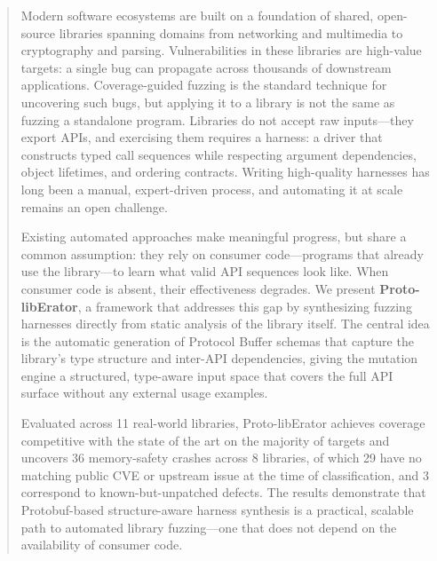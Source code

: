 \documentclass[sigconf,anonymous]{acmart}
\begin{document}
\begin{abstract}
Modern software ecosystems are built on a foundation of shared, open-source
libraries spanning domains from networking and multimedia to cryptography and
parsing. Vulnerabilities in these libraries are high-value targets: a single
bug can propagate across thousands of downstream applications. Coverage-guided
fuzzing is the standard technique for uncovering such bugs, but applying it to
a library is not the same as fuzzing a standalone program. Libraries do not
accept raw inputs---they export APIs, and exercising them requires a harness:
a driver that constructs typed call sequences while respecting argument
dependencies, object lifetimes, and ordering contracts. Writing high-quality
harnesses has long been a manual, expert-driven process, and automating it at
scale remains an open challenge.

Existing automated approaches make meaningful progress, but share a common
assumption: they rely on consumer code---programs that already use the
library---to learn what valid API sequences look like. When consumer code is
absent, their effectiveness degrades. We present \textbf{Proto-libErator}, a
framework that addresses this gap by synthesizing fuzzing harnesses directly
from static analysis of the library itself. The central idea is the automatic
generation of Protocol Buffer schemas that capture the library's type structure
and inter-API dependencies, giving the mutation engine a structured, type-aware
input space that covers the full API surface without any external usage
examples.

Evaluated across 11 real-world libraries, Proto-libErator achieves coverage
competitive with the state of the art on the majority of targets and uncovers
36 memory-safety crashes across 8 libraries, of which 29 have no matching
public CVE or upstream issue at the time of classification, and 3 correspond
to known-but-unpatched defects.  The results demonstrate that
Protobuf-based structure-aware harness synthesis is a practical,
scalable path to automated library fuzzing---one that does not depend on the availability of consumer code.
\end{abstract}

\end{document}
